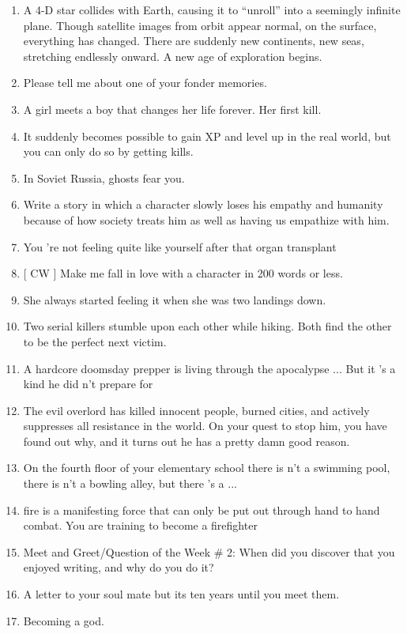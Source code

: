 \begin{enumerate}[noitemsep]
    \item A 4-D star collides with Earth, causing it to “unroll” into a seemingly infinite plane. Though satellite images from orbit appear normal, on the surface, everything has changed. There are suddenly new continents, new seas, stretching endlessly onward. A new age of exploration begins.
    \item Please tell me about one of your fonder memories.
    \item A girl meets a boy that changes her life forever. Her first kill.
    \item It suddenly becomes possible to gain XP and level up in the real world, but you can only do so by getting kills.
    \item In Soviet Russia, ghosts fear you.
    \item Write a story in which a character slowly loses his empathy and humanity because of how society treats him as well as having us empathize with him.
    \item You 're not feeling quite like yourself after that organ transplant
    \item {[} CW {]} Make me fall in love with a character in 200 words or less.
    \item She always started feeling it when she was two landings down.
    \item Two serial killers stumble upon each other while hiking. Both find the other to be the perfect next victim.
    \item A hardcore doomsday prepper is living through the apocalypse ... But it 's a kind he did n't prepare for
    \item The evil overlord has killed innocent people, burned cities, and actively suppresses all resistance in the world. On your quest to stop him, you have found out why, and it turns out he has a pretty damn good reason.
    \item On the fourth floor of your elementary school there is n't a swimming pool, there is n't a bowling alley, but there 's a ...
    \item fire is a manifesting force that can only be put out through hand to hand combat. You are training to become a firefighter
    \item Meet and Greet/Question of the Week \# 2: When did you discover that you enjoyed writing, and why do you do it?
    \item A letter to your soul mate but its ten years until you meet them.
    \item Becoming a god.

\end{enumerate}

